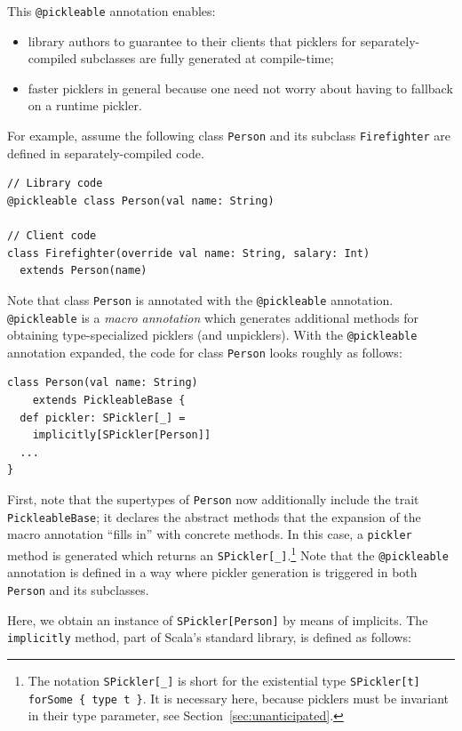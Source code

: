 \documentclass[10pt]{sigplanconf}
\theoremstyle{definition}
\theoremstyle{definition}
\begin{document}
This \verb|@pickleable| annotation enables:

\begin{itemize}
\item library authors to guarantee to their clients that picklers for separately-compiled
subclasses are fully generated at compile-time;

\item faster picklers in general because one need not worry about having to
fallback on a runtime pickler.
\end{itemize}

For example, assume the following class \verb|Person| and its subclass
\verb|Firefighter| are defined in separately-compiled code.

\begin{lstlisting}
// Library code
@pickleable class Person(val name: String)

// Client code
class Firefighter(override val name: String, salary: Int)
  extends Person(name)
\end{lstlisting}

Note that class \verb|Person| is annotated with the \verb|@pickleable|
annotation. \verb|@pickleable| is a {\em macro annotation} which generates
additional methods for obtaining type-specialized picklers (and unpicklers).
With the \verb|@pickleable| annotation expanded, the code for class
\verb|Person| looks roughly as follows:

\begin{lstlisting}
class Person(val name: String)
    extends PickleableBase {
  def pickler: SPickler[_] =
    implicitly[SPickler[Person]]
  ...
}
\end{lstlisting}

First, note that the supertypes of \verb|Person| now additionally include the
trait \verb|PickleableBase|; it declares the abstract methods that the
expansion of the macro annotation ``fills in'' with concrete methods. In this
case, a \verb|pickler| method is generated which returns an
\verb|SPickler[_]|.\footnote{The notation \texttt{SPickler[\_]} is short for
the existential type \texttt{SPickler[t] forSome \{ type t \}}. It is necessary
here, because picklers must be invariant in their type parameter, see
Section~\ref{sec:unanticipated}.} Note that the \verb|@pickleable| annotation
is defined in a way where pickler generation is triggered in both
\verb|Person| and its subclasses.

Here, we obtain an instance of \verb|SPickler[Person]| by means of implicits.
The \verb|implicitly| method, part of Scala's standard library, is defined as
follows:
\end{document}
